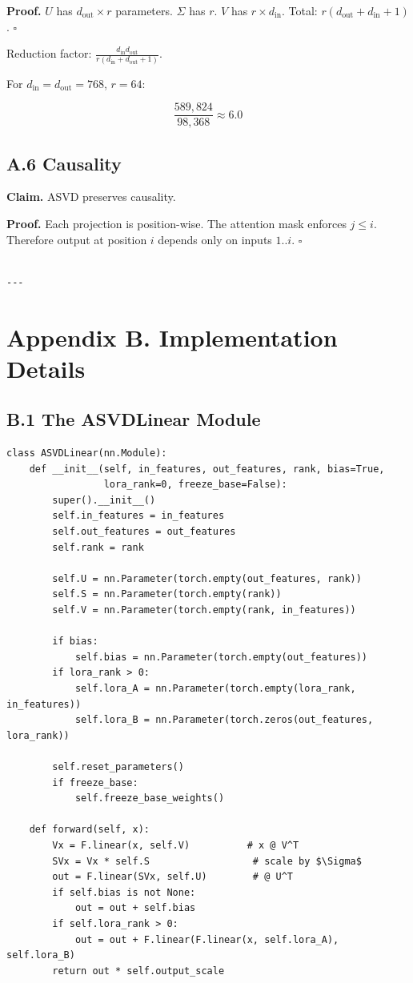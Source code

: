 \textbf{Proof.} $U$ has $d_\text{out} \times r$ parameters. $\Sigma$ has $r$. 
$V$ has $r \times d_\text{in}$. Total: $r(d_\text{out} + d_\text{in} + 1)$. $\square$

Reduction factor: $\frac{d_\text{in} d_\text{out}}{r(d_\text{in} + d_\text{out} + 1)}$.

For $d_\text{in} = d_\text{out} = 768$, $r = 64$:

\[
\frac{589,824}{98,368} \approx 6.0
\]

\subsection{A.6 Causality}

\textbf{Claim.} ASVD preserves causality.

\textbf{Proof.} Each projection is position-wise. The attention mask enforces 
$j \leq i$. Therefore output at position $i$ depends only on inputs 
$1..i$. $\square$
\begin{lstlisting}

---
\end{lstlisting}


\section{Appendix B. Implementation Details}

\subsection{B.1 The ASVDLinear Module}

\begin{lstlisting}
class ASVDLinear(nn.Module):
    def __init__(self, in_features, out_features, rank, bias=True,
                 lora_rank=0, freeze_base=False):
        super().__init__()
        self.in_features = in_features
        self.out_features = out_features
        self.rank = rank
        
        self.U = nn.Parameter(torch.empty(out_features, rank))
        self.S = nn.Parameter(torch.empty(rank))
        self.V = nn.Parameter(torch.empty(rank, in_features))
        
        if bias:
            self.bias = nn.Parameter(torch.empty(out_features))
        if lora_rank > 0:
            self.lora_A = nn.Parameter(torch.empty(lora_rank, in_features))
            self.lora_B = nn.Parameter(torch.zeros(out_features, lora_rank))
        
        self.reset_parameters()
        if freeze_base:
            self.freeze_base_weights()
    
    def forward(self, x):
        Vx = F.linear(x, self.V)          # x @ V^T
        SVx = Vx * self.S                  # scale by $\Sigma$
        out = F.linear(SVx, self.U)        # @ U^T
        if self.bias is not None:
            out = out + self.bias
        if self.lora_rank > 0:
            out = out + F.linear(F.linear(x, self.lora_A), self.lora_B)
        return out * self.output_scale
\end{lstlisting}

